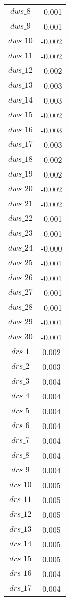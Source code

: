 \begin{center}
\begin{longtable}{cc}
$dws\_8$ 	 & 	 -0.001 \\
$dws\_9$ 	 & 	 -0.001 \\
$dws\_10$ 	 & 	 -0.002 \\
$dws\_11$ 	 & 	 -0.002 \\
$dws\_12$ 	 & 	 -0.002 \\
$dws\_13$ 	 & 	 -0.003 \\
$dws\_14$ 	 & 	 -0.003 \\
$dws\_15$ 	 & 	 -0.002 \\
$dws\_16$ 	 & 	 -0.003 \\
$dws\_17$ 	 & 	 -0.003 \\
$dws\_18$ 	 & 	 -0.002 \\
$dws\_19$ 	 & 	 -0.002 \\
$dws\_20$ 	 & 	 -0.002 \\
$dws\_21$ 	 & 	 -0.002 \\
$dws\_22$ 	 & 	 -0.001 \\
$dws\_23$ 	 & 	 -0.001 \\
$dws\_24$ 	 & 	 -0.000 \\
$dws\_25$ 	 & 	 -0.001 \\
$dws\_26$ 	 & 	 -0.001 \\
$dws\_27$ 	 & 	 -0.001 \\
$dws\_28$ 	 & 	 -0.001 \\
$dws\_29$ 	 & 	 -0.001 \\
$dws\_30$ 	 & 	 -0.001 \\
$drs\_1$ 	 & 	 0.002 \\
$drs\_2$ 	 & 	 0.003 \\
$drs\_3$ 	 & 	 0.004 \\
$drs\_4$ 	 & 	 0.004 \\
$drs\_5$ 	 & 	 0.004 \\
$drs\_6$ 	 & 	 0.004 \\
$drs\_7$ 	 & 	 0.004 \\
$drs\_8$ 	 & 	 0.004 \\
$drs\_9$ 	 & 	 0.004 \\
$drs\_10$ 	 & 	 0.005 \\
$drs\_11$ 	 & 	 0.005 \\
$drs\_12$ 	 & 	 0.005 \\
$drs\_13$ 	 & 	 0.005 \\
$drs\_14$ 	 & 	 0.005 \\
$drs\_15$ 	 & 	 0.005 \\
$drs\_16$ 	 & 	 0.004 \\
$drs\_17$ 	 & 	 0.004 \\

\end{longtable}
\end{center}

